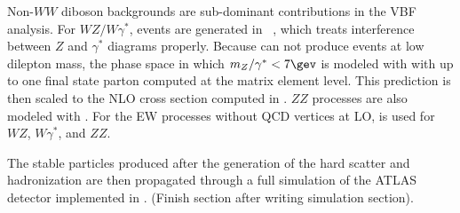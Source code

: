 Non-$WW$ diboson backgrounds are sub-dominant contributions in the VBF
analysis. For $WZ/W\gamma^{\ast}$, events are generated in \POWHEG~\cite{bib:Melia:2011tj},
which treats interference between $Z$ and $\gamma^{\ast}$ diagrams
properly. Because \POWHEG can not produce events at low dilepton mass,
the phase space in which $m_Z/\gamma^{\ast} < 7 \gev$ is
modeled with \SHERPA with up to one final state parton computed at the
matrix element level. This prediction is then scaled to the NLO cross
section computed in \MCFM. $ZZ$ processes are also modeled with
\POWHEG. For the EW processes without QCD vertices at LO, \SHERPA is
used for $WZ$, $W\gamma^{\ast}$, and $ZZ$. 

The stable particles produced after the generation of the hard scatter
and hadronization are then propagated through a full simulation of the
ATLAS detector implemented in \GEANT. (Finish section after writing
simulation section). 





